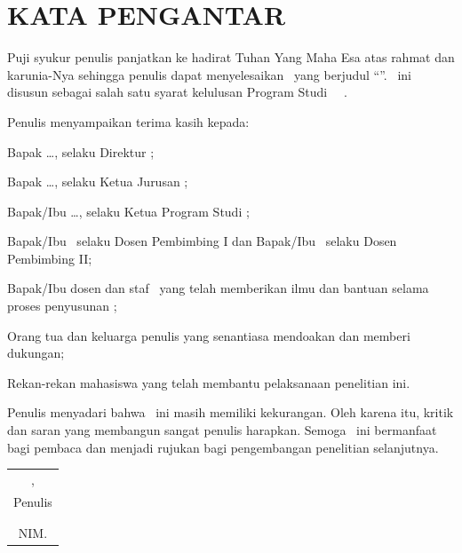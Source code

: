 \chapter*{KATA PENGANTAR}

\vspace{0.5\baselineskip}

\noindent Puji syukur penulis panjatkan ke hadirat Tuhan Yang Maha Esa
atas rahmat dan karunia-Nya sehingga penulis dapat menyelesaikan
\jenisjudul\ yang berjudul ``\textit{\judulid}''. \jenisjudul\ ini
disusun sebagai salah satu syarat kelulusan Program Studi \jenjang\
\prodi\ \institusi.

Penulis menyampaikan terima kasih kepada:

\begin{packed_enum}
  \item Bapak \ldots, selaku Direktur \institusi;
  \item Bapak \ldots, selaku Ketua Jurusan \jurusan;
  \item Bapak/Ibu \ldots, selaku Ketua Program Studi \prodi;
  \item Bapak/Ibu \pembimbingA\ selaku Dosen Pembimbing I dan
        Bapak/Ibu \pembimbingB\ selaku Dosen Pembimbing II;
  \item Bapak/Ibu dosen dan staf \jurusan\ yang telah memberikan ilmu
        dan bantuan selama proses penyusunan \jenisjudul;
  \item Orang tua dan keluarga penulis yang senantiasa mendoakan dan
        memberi dukungan;
  \item Rekan-rekan mahasiswa yang telah membantu pelaksanaan
        penelitian ini.
\end{packed_enum}

Penulis menyadari bahwa \jenisjudul\ ini masih memiliki kekurangan.
Oleh karena itu, kritik dan saran yang membangun sangat penulis
harapkan. Semoga \jenisjudul\ ini bermanfaat bagi pembaca dan menjadi
rujukan bagi pengembangan penelitian selanjutnya.

\vspace{2\baselineskip}

\begin{flushright}
\begin{tabular}{c}
\kota, \tanggalUjian \\
Penulis \\[2.2cm]
\makebox[5.4cm]{\dotfill} \\
\penulis \\
NIM. \nim \\
\end{tabular}
\end{flushright}

